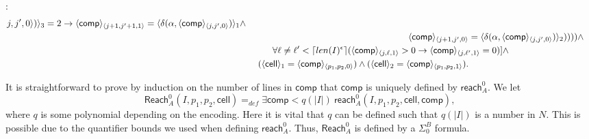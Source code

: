 \documentclass{LMCS}
\newcommand{\abs}[1]{\left\vert#1\right\vert}
\newenvironment{proof}{\QuadSpace\par\noindent{\bf
Proof}:}{\EndProof\HalfSpace} \fi
\newcommand{\QuadSpace}{}\newcommand{\HalfSpace}{}\newcommand{\FullSpace}{}\newcommand{\EndProof}{ \hfill \vrule width 1ex height 1ex depth 0pt }
\newenvironment{proof}{

\smallskip
\noindent\emph{Proof.}}{\hfill\(\Box\)
\bigskip
} \fi
\begin{document}
\begin{proof}
\begin{equation*}
\begin{split}
{        j,j',0\rangle})\rangle_3=2\rightarrow \langle\mathsf{comp}\rangle_{\langle j+1,j'+1,1\rangle}=\langle \delta(\alpha,\langle\mathsf{comp}\rangle_{\langle
      j,j',0\rangle})\rangle_1 \land\\
&\hspace{179 pt}
      \langle\mathsf{comp}\rangle_{\langle j+1,j',0\rangle}=\langle \delta(\alpha,\langle\mathsf{comp}\rangle_{\langle
      j,j',0\rangle})\rangle_2))))\land\\
&\phantom{{}\equiv{}}\hspace{16pt}
      \forall\ell\neq\ell'<\lceil len(I)^{\epsilon}\rceil(
      \langle\mathsf{comp}\rangle_{\langle j,\ell,1\rangle}>0\rightarrow
      \langle\mathsf{comp}\rangle_{\langle
        j,\ell',1\rangle}=0)]\land\\
&\phantom{{}\equiv{}}
      (\langle \mathsf{cell}\rangle_1 = \langle\mathsf{comp}\rangle_{\langle p_1,p_2,0\rangle})\land
      (\langle \mathsf{cell}\rangle_2 = \langle\mathsf{comp}\rangle_{\langle p_1,p_2,1\rangle}).
    \end{split}
  \end{equation*}




  \noindent It is straightforward to prove by induction on the number of lines in $\mathsf{comp}$ that $\mathsf{comp}$
  is uniquely defined by
  $\mathsf{reach}^0_A$. We let $$\mathsf{Reach}^0_A(I,p_1,p_2,\mathsf{cell})=_{def}\exists\mathsf{comp}<q(\abs{I})\
  \mathsf{reach}^0_A(I,p_1,p_2,\mathsf{cell},\mathsf{comp}),$$
  where $q$ is some polynomial depending on the encoding. Here it is vital that $q$ can be defined such that
  $q(\abs{I})$ is a number in $N$. This is possible due to the quantifier bounds we used when defining
  $\mathsf{reach}^0_A$. Thus, $\mathsf{Reach}^0_A$ is defined by a $\Sigma^B_0$ formula.


\end{proof}
\end{document}

